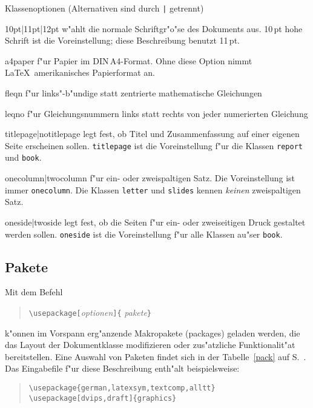 \begin{table}[hbpt]
\caption[Klassenoptionen]{Klassenoptionen (Alternativen sind durch \texttt{|}
  getrennt)} \label{options}
\oben{11cm}
\begin{ttdescription}%
\item [10pt|11pt|12pt] w"ahlt die normale Schriftgr"o"se des Dokuments aus.
  10\,pt hohe Schrift ist die Voreinstellung; diese Beschreibung benutzt 11\,pt.

\item[a4paper] f"ur Papier im DIN\,A4-Format. Ohne diese
  Option nimmt \LaTeX\ amerikanisches Papierformat an.
 
\item [fleqn] f"ur links"-b"undige statt zentrierte mathematische
  Gleichungen
 
\item [leqno] f"ur Gleichungsnummern links statt rechts von jeder
  numerierten Gleichung
 
\item [titlepage|notitlepage] legt fest, ob Titel und Zusammenfassung
  auf einer eigenen Seite erscheinen sollen.  \texttt{titlepage} ist
  die Voreinstellung f"ur die Klassen \texttt{report} und \texttt{book}.
 
\item [onecolumn|twocolumn] f"ur ein- oder zweispaltigen Satz.
 Die Voreinstellung ist immer \texttt{onecolumn}.  
 Die Klassen \texttt{letter} und \texttt{slides} kennen \emph{keinen}
 zweispaltigen Satz.
 
\item [oneside|twoside] legt fest, ob die Seiten f"ur ein- oder
  zweiseitigen  Druck gestaltet werden sollen.  
  \texttt{oneside} ist die Voreinstellung f"ur
  alle Klassen au"ser \texttt{book}.
  
\end{ttdescription}
\unten
\end{table}



\subsection{Pakete}\label{packages}
 
Mit dem Befehl
\begin{verse}
\verb:\usepackage[:\textit{optionen}\verb:]{:%
  \textit{pakete}\verb:}:
\end{verse}
k"onnen im Vorspann erg"anzende Makropakete (packages) geladen werden,
die das Layout der Dokumentklasse
modifizieren oder zus"atzliche Funktionalit"at bereitstellen.
Eine Auswahl von Paketen findet sich in der Tabelle~\ref{pack} 
auf S.~\pageref{pack}.
Das Eingabefile f"ur diese Beschreibung enth"alt beispielsweise:
\begin{verse}
\verb|\usepackage{german,latexsym,textcomp,alltt}|\\
\verb|\usepackage[dvips,draft]{graphics}|
\end{verse}


